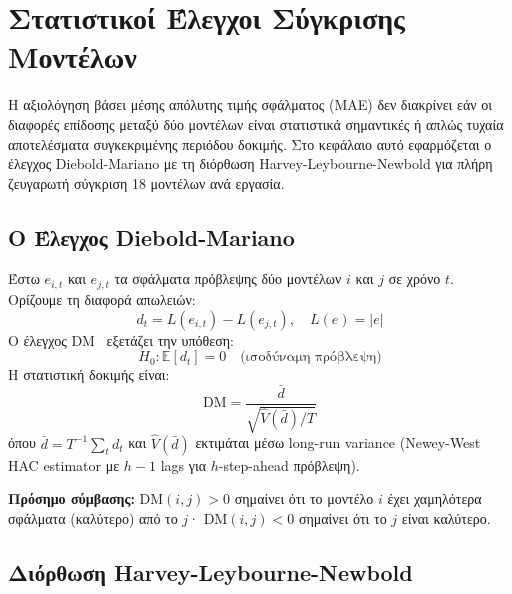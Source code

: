 \chapter{Στατιστικοί Έλεγχοι Σύγκρισης Μοντέλων}
\label{ch:dm}

Η αξιολόγηση βάσει μέσης απόλυτης τιμής σφάλματος (MAE) δεν διακρίνει εάν
οι διαφορές επίδοσης μεταξύ δύο μοντέλων είναι στατιστικά σημαντικές ή
απλώς τυχαία αποτελέσματα συγκεκριμένης περιόδου δοκιμής. Στο κεφάλαιο αυτό
εφαρμόζεται ο έλεγχος Diebold-Mariano με τη διόρθωση Harvey-Leybourne-Newbold
για πλήρη ζευγαρωτή σύγκριση 18 μοντέλων ανά εργασία.

\section{Ο Έλεγχος Diebold-Mariano}
\label{sec:dm_theory}

Έστω $e_{i,t}$ και $e_{j,t}$ τα σφάλματα πρόβλεψης δύο μοντέλων $i$ και $j$
σε χρόνο $t$. Ορίζουμε τη διαφορά απωλειών:
\begin{equation}
    d_t = L(e_{i,t}) - L(e_{j,t}), \quad L(e) = |e|
    \label{eq:dm_loss}
\end{equation}
Ο έλεγχος DM~\cite{diebold1995} εξετάζει την υπόθεση:
\begin{equation}
    H_0: \mathbb{E}[d_t] = 0 \quad \text{(ισοδύναμη πρόβλεψη)}
\end{equation}
Η στατιστική δοκιμής είναι:
\begin{equation}
    \text{DM} = \frac{\bar{d}}{\sqrt{\hat{V}(\bar{d}) / T}}
    \label{eq:dm_stat}
\end{equation}
όπου $\bar{d} = T^{-1} \sum_t d_t$ και $\hat{V}(\bar{d})$ εκτιμάται μέσω
long-run variance (Newey-West HAC estimator με $h-1$ lags για $h$-step-ahead
πρόβλεψη).

\textbf{Πρόσημο σύμβασης:} DM$(i,j) > 0$ σημαίνει ότι το μοντέλο $i$ έχει
χαμηλότερα σφάλματα (καλύτερο) από το $j$· DM$(i,j) < 0$ σημαίνει ότι το
$j$ είναι καλύτερο.

\section{Διόρθωση Harvey-Leybourne-Newbold}
\label{sec:hln}

